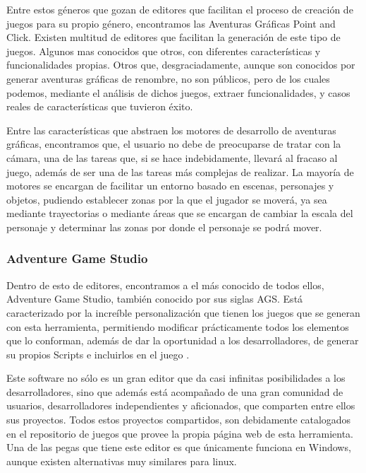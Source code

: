 Entre estos géneros que gozan de editores que facilitan el proceso de creación de juegos para su propio género, encontramos las Aventuras Gráficas Point and Click. Existen multitud de editores que facilitan la generación de este tipo de juegos. Algunos mas conocidos que otros, con diferentes características y funcionalidades propias. Otros que, desgraciadamente, aunque son conocidos por generar aventuras gráficas de renombre, no son públicos, pero de los cuales podemos, mediante el análisis de dichos juegos, extraer funcionalidades, y casos reales de características que tuvieron éxito.

Entre las características que abstraen los motores de desarrollo de aventuras gráficas, encontramos que, el usuario no debe de preocuparse de tratar con la cámara, una de las tareas que, si se hace indebidamente, llevará al fracaso al juego, además de ser una de las tareas más complejas de realizar. La mayoría de motores se encargan de facilitar un entorno basado en escenas, personajes y objetos, pudiendo establecer zonas por la que el jugador se moverá, ya sea mediante trayectorias o mediante áreas que se encargan de cambiar la escala del personaje y determinar las zonas por donde el personaje se podrá mover.

\subsubsection{Adventure Game Studio}
\label{adventuregamestudio}

Dentro de esto de editores, encontramos a el más conocido de todos ellos, Adventure Game Studio, también conocido por sus siglas AGS. Está caracterizado por la increíble personalización que tienen los juegos que se generan con esta herramienta, permitiendo modificar prácticamente todos los elementos que lo conforman, además de dar la oportunidad a los desarrolladores, de generar su propios Scripts e incluirlos en el juego \cite{adventuregamestudio}. 

Este software no sólo es un gran editor que da casi infinitas posibilidades a los desarrolladores, sino que además está acompañado de una gran comunidad de usuarios, desarrolladores independientes y aficionados, que comparten entre ellos sus proyectos. Todos estos proyectos compartidos, son debidamente catalogados en el repositorio de juegos que provee la propia página web de esta herramienta. Una de las pegas que tiene este editor es que únicamente funciona en Windows, aunque existen alternativas muy similares para linux.

